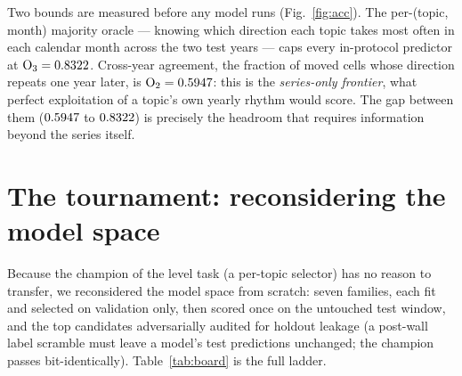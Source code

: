 \documentclass[11pt]{artaquest}
\begin{document}
Two bounds are measured before any model runs (Fig.~\ref{fig:acc}). The per-(topic,\,month) majority
oracle --- knowing which direction each topic takes most often in each calendar month across the two
test years --- caps every in-protocol predictor at $\mathrm{O_3}=0.8322$. Cross-year agreement,
the fraction of moved cells whose direction repeats one year later, is $\mathrm{O_2}=0.5947$: this
is the \emph{series-only frontier}, what perfect exploitation of a topic's own yearly rhythm would
score. The gap between them ($0.5947$ to $0.8322$) is precisely the headroom that requires
information beyond the series itself.

\section{The tournament: reconsidering the model space}

Because the champion of the level task (a per-topic selector) has no reason to transfer, we
reconsidered the model space from scratch: seven families, each fit and selected on validation only,
then scored once on the untouched test window, and the top candidates adversarially audited for
holdout leakage (a post-wall label scramble must leave a model's test predictions unchanged; the
champion passes bit-identically). Table~\ref{tab:board} is the full ladder.
\end{document}
